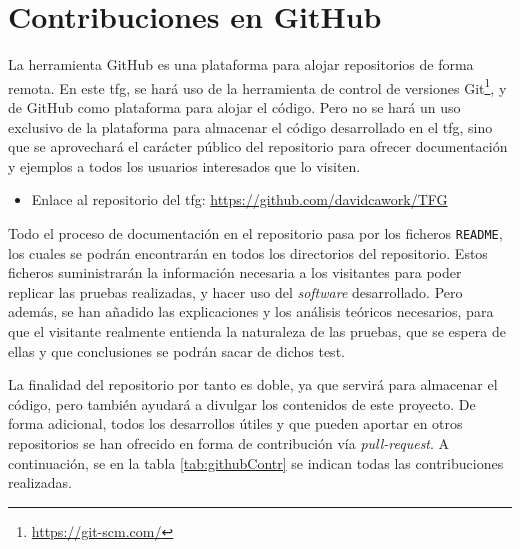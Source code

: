 \section{Contribuciones en GitHub}
\label{estadoArte_github}


La herramienta GitHub \cite{github2016github} es una plataforma para alojar repositorios de forma remota. En este \gls{tfg}, se hará uso de la herramienta de control de versiones Git\footnote{\url{https://git-scm.com/}}, y de GitHub como plataforma para alojar el código. Pero no se hará un uso exclusivo de la plataforma para almacenar el código desarrollado en el \gls{tfg}, sino que se aprovechará el carácter público del repositorio para ofrecer documentación y ejemplos a todos los usuarios interesados que lo visiten. \\
\par
\begin{itemize}
    \item Enlace al repositorio del \gls{tfg}: \url{https://github.com/davidcawork/TFG} 
\end{itemize}
\vspace{0.5cm}
Todo el proceso de documentación en el repositorio pasa por los ficheros \texttt{README}, los cuales se podrán encontrarán en todos los directorios del repositorio. Estos ficheros suministrarán la información necesaria a los visitantes para poder replicar las pruebas realizadas, y hacer uso del \textit{software} desarrollado. Pero además, se han añadido las explicaciones y  los análisis teóricos necesarios, para que el visitante realmente entienda la naturaleza de las pruebas, que se espera de ellas y que conclusiones se podrán sacar de dichos test.  \\
\par

La finalidad del repositorio por tanto es doble, ya que servirá para almacenar el código, pero también ayudará a divulgar los contenidos de este proyecto. De forma adicional, todos los desarrollos útiles y que pueden aportar en otros repositorios se han ofrecido en forma de contribución vía \textit{pull-request}. A continuación, se en la tabla \ref{tab:githubContr} se indican  todas las contribuciones realizadas.\\
\par

